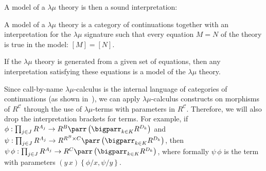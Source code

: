 \documentclass{CSML}
\newcommand*\LogSubst[1]{\left\{#1\right\}}
\newcommand*\LmTermA{M}
\newcommand*\LmTermB{N}
\newcommand*\LmVarA{x}
\newcommand*\LmVarB{y}
\newcommand*\CatC{\mathcal{C}}
\newcommand*\CatObjA{A}
\newcommand*\CatObjB{B}
\newcommand*\CatObjC{C}
\newcommand*\CatObjD{D}
\newcommand*\CatR{R}
\newcommand*\CatRC{\CatExp{\CatR}{\CatC}}
\newcommand*\CatTimes\times
\newcommand*\CatExp[2]{#1^{#2}}
\newcommand*\CatPar\parr
\newcommand*\CatRCHomA\phi
\newcommand*\CatRCHomB\psi
\newcommand*\CatInterpTerm[1]{\left[#1\right]}
\begin{document}
A model of a $\lambda\mu$ theory is then a sound interpretation:
\begin{defi}
\label{LambdaMuModel}
A model of a $\lambda\mu$ theory is a category of continuations together with an interpretation for the $\lambda\mu$ signature such that every equation $\LmTermA=\LmTermB$ of the theory is true in the model: $\CatInterpTerm{\LmTermA}=\CatInterpTerm{\LmTermB}$.
\end{defi}
If the $\lambda\mu$ theory is generated from a given set of equations, then any interpretation satisfying these equations is a model of the $\lambda\mu$ theory.\par
Since call-by-name $\lambda\mu$-calculus is the internal language of categories of continuations (as shown in~\cite{SelingerControl}), we can apply $\lambda\mu$-calculus constructs on morphisms of $\CatRC$ through the use of $\lambda\mu$-terms with parameters in $\CatRC$. Therefore, we will also drop the interpretation brackets for terms. For example, if $\CatRCHomA:\prod_{j\in J}\CatExp{\CatR}{\CatObjA_j}\to\CatExp{\CatR}{\CatObjB}\CatPar\left(\bigparr_{k\in K}\CatExp{\CatR}{\CatObjD_k}\right)$ and $\CatRCHomB:\prod_{j\in J}\CatExp{\CatR}{\CatObjA_j}\to\CatExp{\CatR}{\CatExp{\CatR}{\CatObjB}\CatTimes\CatObjC}\CatPar\left(\bigparr_{k\in K}\CatExp{\CatR}{\CatObjD_k}\right)$, then $\CatRCHomB\,\CatRCHomA:\prod_{j\in J}\CatExp{\CatR}{\CatObjA_j}\to\CatExp{\CatR}{\CatObjC}\CatPar\left(\bigparr_{k\in K}\CatExp{\CatR}{\CatObjD_k}\right)$, where formally $\CatRCHomB\,\CatRCHomA$ is the term with parameters $\left(\LmVarB\,\LmVarA\right)\LogSubst{\CatRCHomA/\LmVarA,\CatRCHomB/\LmVarB}$.
\end{document}
